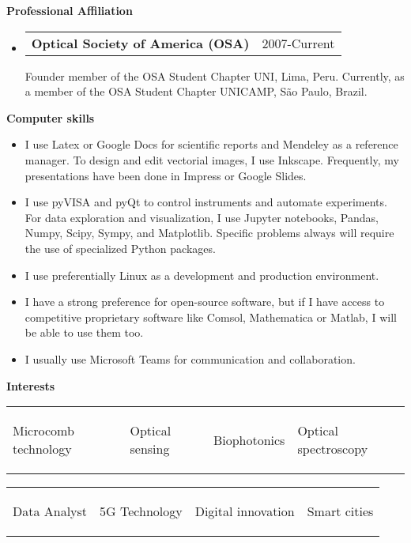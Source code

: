 \documentclass[letterpaper, 12pt]{article}[leftmargin=*]
\makeatletter
\renewcommand{\section}[2]{
  \colorbox{secondary}{\color{white}\raggedbottom\normalsize\textbf{{#1}{\hspace{7pt}#2}}}
}
\newcommand{\resumeEntryStart}{\begin{itemize}[leftmargin=2.5mm]\itemsep8pt}
\newcommand{\resumeEntryEnd}{\end{itemize}}
\newcommand{\resumeItemListStart}{\begin{itemize}[leftmargin=4.5mm]\itemsep-3pt}
\newcommand{\resumeItemListEnd}{\end{itemize}}
\newcommand{\resumeItem}[1]{
  \item\small{
    {#1}
  }
}
\newcommand{\resumeEntryTD}[2]{
  \item[]
    \begin{tabularx}{0.97\textwidth}{X@{\hspace{60pt}}r}
      \textbf{\color{primary}#1} & {\firabook\color{accent}\small#2}
    \end{tabularx}\vspace{2pt}
}
\newcommand{\resumeEntryS}[2]{
  \item[]\small{
    \textbf{\color{primary}#1 }{ #2 }
  }
}
\newcommand{\fourthcol}[4]{
	\vspace{-0.3cm}
	\begin{tabularx}{\textwidth}{XXXX}
		{\small#1} & {\small#2} & {\small#3} & {\small#4}
	\end{tabularx}
}
\makeatother
\begin{document}
\section{\faGroup}{Professional Affiliation}
\resumeEntryStart
\resumeEntryTD
{\small Optical Society of America (OSA)}{2007-Current}
{\footnotesize Founder member of the OSA Student Chapter UNI, Lima, Peru. Currently, as a member of the OSA Student Chapter UNICAMP, São Paulo, Brazil.}
\resumeEntryEnd

\section{\faDesktop}{Computer skills}
\resumeItemListStart
\resumeItem{I use Latex or Google Docs for scientific reports and Mendeley as a reference manager. To design and edit vectorial images, I use Inkscape. Frequently, my presentations have been done in Impress or Google Slides.}
\resumeItem{I use pyVISA and pyQt to control instruments and automate experiments. For data exploration and visualization, I use Jupyter notebooks, Pandas, Numpy, Scipy, Sympy, and Matplotlib. Specific problems always will require the use of specialized Python packages.}
\resumeItem{I use preferentially Linux as a development and production environment.}
\resumeItem{I have a strong preference for open-source software, but if I have access to competitive proprietary software like Comsol, Mathematica or Matlab, I will be able to use them too.}
\resumeItem{I usually use Microsoft Teams for communication and collaboration.}
\resumeItemListEnd

\section{\faThumbTack}{Interests}
\vspace{-0.75cm}
\resumeEntryStart
\small
\fourthcol{\resumeEntryS{}{\item Microcomb technology}}{\resumeEntryS{}{\item Optical sensing}}{\resumeEntryS{}{\item Biophotonics}}{\resumeEntryS{}{\item Optical spectroscopy}}
\vspace{-0.75cm}
\fourthcol{\resumeEntryS{}{\item Data Analyst}}{\resumeEntryS{}{\item 5G Technology}}{\resumeEntryS{}{\item Digital innovation}}{\resumeEntryS{}{\item Smart cities}}
\resumeEntryEnd
\end{document}
